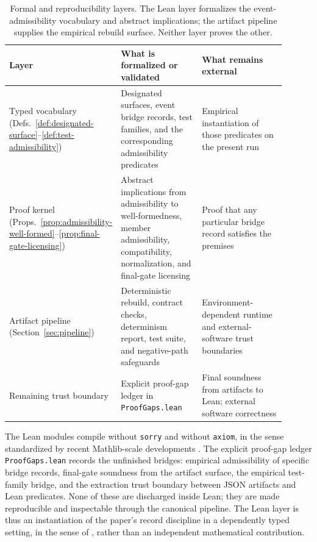 \documentclass[11pt]{article}
\theoremstyle{definition}
\begin{document}
\begin{table}[t]
\centering
\small
\setlength{\tabcolsep}{4pt}
\begin{tabular}{p{0.22\linewidth}p{0.32\linewidth}p{0.36\linewidth}}
\hline
\textbf{Layer} & \textbf{What is formalized or validated} & \textbf{What remains external} \\
\hline
Typed vocabulary (Defs.~\ref{def:designated-surface}--\ref{def:test-admissibility}) & Designated surfaces, event bridge records, test families, and the corresponding admissibility predicates & Empirical instantiation of those predicates on the present run \\[0.5em]
Proof kernel (Props.~\ref{prop:admissibility-well-formed}--\ref{prop:final-gate-licensing}) & Abstract implications from admissibility to well-formedness, member admissibility, compatibility, normalization, and final-gate licensing & Proof that any particular bridge record satisfies the premises \\[0.5em]
Artifact pipeline (Section~\ref{sec:pipeline}) & Deterministic rebuild, contract checks, determinism report, test suite, and negative-path safeguards & Environment-dependent runtime and external-software trust boundaries \\[0.5em]
Remaining trust boundary & Explicit proof-gap ledger in \texttt{ProofGaps.lean} & Final soundness from artifacts to Lean; external software correctness \\
\hline
\end{tabular}
\caption{Formal and reproducibility layers. The Lean layer formalizes the event-admissibility vocabulary and abstract implications; the artifact pipeline supplies the empirical rebuild surface. Neither layer proves the other.}
\label{tab:formal-repro-layers}
\end{table}

The Lean modules compile without \texttt{sorry} and without \texttt{axiom}, in the sense standardized by recent Mathlib-scale developments \citep{Buzzard2020Perfectoid}. The explicit proof-gap ledger \texttt{ProofGaps.lean} records the unfinished bridges: empirical admissibility of specific bridge records, final-gate soundness from the artifact surface, the empirical test-family bridge, and the extraction trust boundary between JSON artifacts and Lean predicates. None of these are discharged inside Lean; they are made reproducible and inspectable through the canonical pipeline. The Lean layer is thus an instantiation of the paper's record discipline in a dependently typed setting, in the sense of \citet{AvigadHarrison2014}, rather than an independent mathematical contribution.
\end{document}
